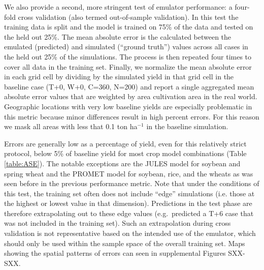 \documentclass[gmd, manuscript]{copernicus} %
\begin{document}
We also provide a second, more stringent test of emulator performance: a four-fold cross validation (also termed out-of-sample validation). 
In this test the training data is split and the model is trained on 75\% of the data and tested on the held out 25\%.
The mean absolute error is the calculated between the emulated (predicted) and simulated (``ground truth'') values across all cases in the held out 25\% of the simulations. 
The process is then repeated four times to cover all data in the training set. 
Finally, we normalize the mean absolute error in each grid cell by dividing by the simulated yield in that grid cell in the baseline case (T+0, W+0, C=360, N=200) and report a single aggregated mean absolute error values that are weighted by area cultivation area in the real world. 
Geographic locations with very low baseline yields are especially problematic in this metric because minor differences result in high percent errors. 
For this reason we mask all areas with less that 0.1 ton ha$^{-1}$ in the baseline simulation. 

Errors are generally low as a percentage of yield, even for this relatively strict protocol, below 5\% of baseline yield for most crop model combinations (Table \ref{table:ASE}).
The notable exceptions are the JULES model for soybean and spring wheat and the PROMET model for soybean, rice, and the wheats as was seen before in the previous performance metric.
Note that under the conditions of this test, the training set often does not include ``edge'' simulations (i.e. those at the highest or lowest value in that dimension).
Predictions in the test phase are therefore extrapolating out to these edge values (e.g.\ predicted a T+6 case that was not included in the training set).
Such an extrapolation during cross validation is not representative based on the intended use of the emulator, which should only be used within the sample space of the overall training set.
Maps showing the spatial patterns of errors can seen in supplemental Figures SXX-SXX. 

\end{document}
